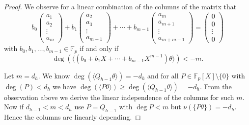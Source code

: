 \documentclass[10pt,a4paper]{amsart}
\newcommand{\FF}{\mathbb{F}}
\renewcommand{\(}{\left (}
\renewcommand{\)}{\right )}
\theoremstyle{definition}
\numberwithin{equation}{section}
\begin{document}
\begin{proof}
	We observe for a linear combination of the columns of the matrix that 
	$$b_0\begin{pmatrix}
		a_1\\
		a_2\\
		\vdots\\
		a_{m}
	\end{pmatrix} +b_1\begin{pmatrix}
		a_2\\
		a_3\\
		\vdots\\
		a_{m+1}
	\end{pmatrix}+\cdots + b_{m-1}\begin{pmatrix}
		a_m\\
		a_{m+1}\\
		\vdots\\
		a_{m+m-1}
	\end{pmatrix} =\begin{pmatrix}
		0\\
		0\\
		\vdots\\
		0
	\end{pmatrix}$$
	with $b_0,b_1,\ldots,b_{m-1}\in\FF_p$ if and only if 
	$$\deg(\langle(b_0+b_1X+\cdots+b_{m-1}X^{m-1})\theta\rangle)< -m.$$
	
	Let $m=d_h$. We know $\deg(\langle Q_{h-1}\theta\rangle)=-d_{h}$ and for all $P\in\FF_p[X]\setminus\{0\}$ with $\deg(P)<d_{h}$ we have $\deg(\langle P\theta\rangle)\geq \deg(\langle Q_{h-1}\theta\rangle)=-d_{h}$. From the observation above we derive the linear independence of the columns for such $m$. %
	Now if $d_{h-1}<m<d_h$ use $P=Q_{h-1}$ with $\deg P<m$ but $\nu(\{P\theta\})=-d_h$. Hence the columns are linearly depending. %
\end{proof}
\end{document}
